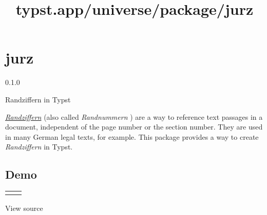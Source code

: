 \title{typst.app/universe/package/jurz}

\label{banner}
\section{jurz}\label{jurz}

{ 0.1.0 }

Randziffern in Typst

\label{readme}
\href{https://de.wikipedia.org/w/index.php?title=Randnummer&oldid=231943223}{\emph{Randziffern}}
(also called \emph{Randnummern} ) are a way to reference text passages
in a document, independent of the page number or the section number.
They are used in many German legal texts, for example. This package
provides a way to create \emph{Randziffern} in Typst.

\subsection{Demo}\label{demo}

\begin{longtable}[]{@{}ll@{}}
\toprule\noalign{}
\endhead
\bottomrule\noalign{}
\endlastfoot
\pandocbounded{}
&
\pandocbounded{} \\
\end{longtable}

View source

\begin{Shaded}
\begin{Highlighting}[]
\NormalTok{)}








\end{Highlighting}
\end{Shaded}

